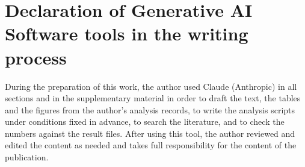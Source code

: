 \section*{Declaration of Generative AI Software tools in the writing process}

During the preparation of this work, the author used Claude (Anthropic) in all sections and in the supplementary
material in order to draft the text, the tables and the figures from the author's analysis records, to write the
analysis scripts under conditions fixed in advance, to search the literature, and to check the numbers against the
result files. After using this tool, the author reviewed and edited the content as needed and takes full
responsibility for the content of the publication.
